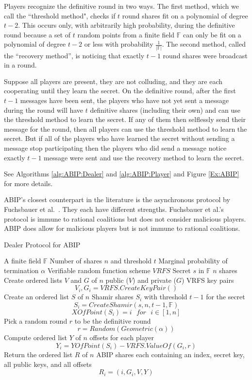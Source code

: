 \documentclass{dalcsthesis}
\begin{document}
Players recognize the definitive round in two ways. The first method, which we call the ``threshold method", checks if $t$ round shares fit on a polynomial of degree $t-2$. This occurs only, with arbitrarily high probability, during the definitive round because a set of $t$ random points from a finite field $\mathbb{F}$ can only be fit on a polynomial of degree $t-2$ or less with probability $\frac{1}{|\mathbb{F}|}$. The second method, called the ``recovery method'', is noticing that exactly $t-1$ round shares were broadcast in a round.

Suppose all players are present, they are not colluding, and they are each cooperating until they learn the secret. On the definitive round, after the first $t-1$ messages have been sent, the players who have not yet sent a message during the round will have $t$ definitive shares (including their own) and can use the threshold method to learn the secret. If any of them then selflessly send their message for the round, then all players can use the threshold method to learn the secret. But if all of the players who have learned the secret without sending a message stop participating then the players who did send a message notice exactly $t-1$ message were sent and use the recovery method to learn the secret.

See Algorithms \ref{alg:ABIP:Dealer} and \ref{alg:ABIP:Player} and Figure \ref{Ex:ABIP} for more details.

ABIP's closest counterpart in the literature is the asynchronous protocol by Fuchsbauer et al.~\cite{fuch10}. They each have different strengths. Fuchsbauer et al.'s protocol is immune to rational coalitions but does not consider malicious players. ABIP does allow for malicious players but is not immune to rational coalitions.

\begin{algorithm}
  \caption{Dealer Protocol for ABIP}
  \label{alg:ABIP:Dealer}
  \begin{algorithmic}
    \INPUT A finite field $\mathbb{F}$
    \INPUT Number of shares $n$ and threshold $t$
    \INPUT Marginal probability of termination $\alpha$
    \INPUT Verifiable random function scheme $VRFS$
    \INPUT Secret $s$ in $\mathbb{F}$
    \OUTPUT $n$ shares
    \STATE Create ordered lists $V$ and $G$ of $n$ public ($V$) and private ($G$) VRFS key pairs
    	$$V_i, G_i = VRFS.CreateKeyPair()$$
    \STATE Create an ordered list $S$ of $n$ Shamir shares $S_i$ with threshold $t-1$ for the secret
    	$$S_i = CreateShamir(s, n, t - 1, \mathbb{F})$$
    	$$XOfPoint(S_i) = i \text{ } for \text{ } i \in [1, n]$$
    \STATE Pick a random round $r$ to be the definitive round
        $$r = Random(Geometric(\alpha))$$
    \STATE Compute ordered list $Y$ of $n$ offsets for each player
    	$$Y_i = YOfPoint(S_i) - VRFS.ValueOf(G_i, r)$$
    \STATE Return the ordered list $R$ of $n$ ABIP shares each containing an index, secret key, all public keys, and all offsets 
    	$$R_i = (i, G_i, V, Y)$$
  \end{algorithmic}
\end{algorithm}
\end{document}
